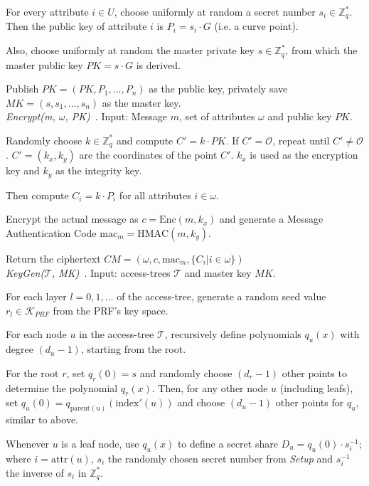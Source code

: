 For every attribute $i \in U$, choose uniformly at random a secret number $s_i \in \mathbb{Z}_q^*$.
Then the public key of attribute $i$ is $P_i = s_i \cdot G$ (i.e. a curve point).

Also, choose uniformly at random the master private key $s \in \mathbb{Z}_q^*$, from which the master public key $PK = s \cdot G$ is derived.

Publish $PK=(PK, P_1, \dots, P_n)$ as the public key, privately save $MK = (s, s_1, \dots, s_n)$ as the master key.
\\

\noindent \emph{Encrypt(m, $\omega$, PK)}~\cite{yao_lightweight_2015}.
Input: Message $m$, set of attributes $\omega$ and public key $PK$.

Randomly choose $k \in \mathbb{Z}_q^*$ and compute $C' = k \cdot PK$. If $C' = \mathcal{O}$, repeat until $C' \neq \mathcal{O}$.
$C' = (k_x, k_y)$ are the coordinates of the point $C'$. $k_x$ is used as the encryption key and $k_y$ as the integrity key.

Then compute $C_i = k \cdot P_i$ for all attributes $i \in \omega$.

Encrypt the actual message as $c = \text{Enc}(m, k_x)$ and generate a Message Authentication Code $\text{mac}_m = \text{HMAC}(m, k_y)$.

Return the ciphertext $CM = (\omega, c, \text{mac}_m, \{C_i | i \in \omega\})$\\

\noindent \emph{KeyGen($\mathcal{T}$, MK)}~\cite{yao_lightweight_2015,tan_enhancement_2019}.
Input: \glspl{access-tree} $\mathcal{T}$ and master key $MK$.

For each layer $l = 0, 1, \dots$ of the \gls{access-tree}, generate a random seed value $r_l \in \mathcal{K}_{PRF}$ from the PRF's key space.

For each node $u$ in the \gls{access-tree} $\mathcal{T}$, recursively define polynomials $q_u(x)$ with degree $(d_u - 1)$, starting from the root.

For the root $r$, set $q_r(0) = s$ and randomly choose $(d_r - 1)$ other points to determine the polynomial $q_r(x)$.
Then, for any other node $u$ (including leafs), set $q_u(0) = q_{\text{parent}(u)}(\text{index}'(u))$ and choose $(d_u -1)$ other points for $q_u$, similar to above.

Whenever $u$ is a leaf node, use $q_u(x)$ to define a secret share $D_u = q_u(0) \cdot s_i^{-1}$; where $i = \text{attr}(u)$, $s_i$ the randomly chosen secret number from \emph{Setup} and $s_i^{-1}$ the inverse of $s_i$ in $\mathbb{Z}_q^*$.

